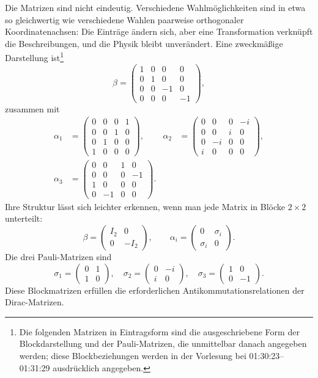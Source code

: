 Die Matrizen sind nicht eindeutig. Verschiedene Wahlmöglichkeiten sind in etwa so gleichwertig wie verschiedene Wahlen paarweise orthogonaler Koordinatenachsen: Die Einträge ändern sich, aber eine Transformation verknüpft die Beschreibungen, und die Physik bleibt unverändert. Eine zweckmäßige Darstellung ist\footnote{Die folgenden Matrizen in Eintragsform sind die ausgeschriebene Form der Blockdarstellung und der Pauli-Matrizen, die unmittelbar danach angegeben werden; diese Blockbeziehungen werden in der Vorlesung bei 01:30:23--01:31:29 ausdrücklich angegeben.}
\begin{equation}
\beta=
\begin{pmatrix}
1&0&0&0\\
0&1&0&0\\
0&0&-1&0\\
0&0&0&-1
\end{pmatrix},
\end{equation}
zusammen mit
\begin{align}
\alpha_1&=
\begin{pmatrix}
0&0&0&1\\
0&0&1&0\\
0&1&0&0\\
1&0&0&0
\end{pmatrix},
&
\alpha_2&=
\begin{pmatrix}
0&0&0&-i\\
0&0&i&0\\
0&-i&0&0\\
i&0&0&0
\end{pmatrix},
\\[1ex]
\alpha_3&=
\begin{pmatrix}
0&0&1&0\\
0&0&0&-1\\
1&0&0&0\\
0&-1&0&0
\end{pmatrix}.
\end{align}
Ihre Struktur lässt sich leichter erkennen, wenn man jede Matrix in Blöcke \(2\times2\) unterteilt:
\begin{equation}
\beta=
\begin{pmatrix}
I_2&0\\
0&-I_2
\end{pmatrix},
\qquad
\alpha_i=
\begin{pmatrix}
0&\sigma_i\\
\sigma_i&0
\end{pmatrix}.
\end{equation}
Die drei Pauli-Matrizen sind
\begin{equation}
\sigma_1=
\begin{pmatrix}
0&1\\
1&0
\end{pmatrix},
\quad
\sigma_2=
\begin{pmatrix}
0&-i\\
i&0
\end{pmatrix},
\quad
\sigma_3=
\begin{pmatrix}
1&0\\
0&-1
\end{pmatrix}.
\end{equation}
Diese Blockmatrizen erfüllen die erforderlichen Antikommutationsrelationen der Dirac-Matrizen.

